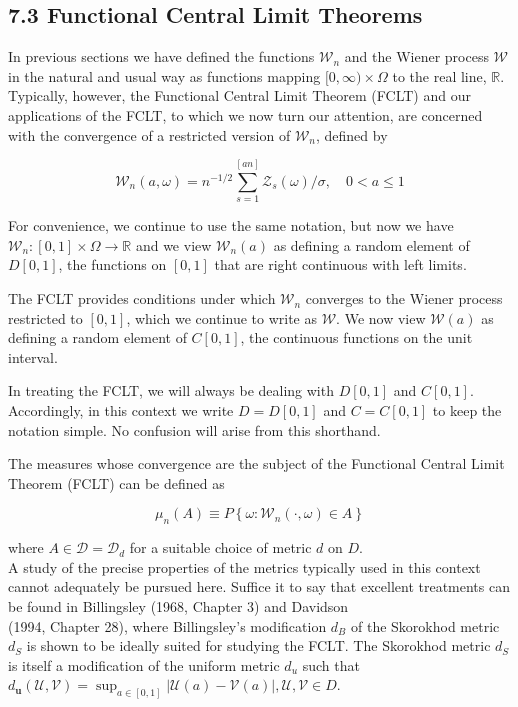 \documentclass[10pt]{article}
\begin{document}
\subsection*{7.3 Functional Central Limit Theorems}
In previous sections we have defined the functions $\mathcal{W}_{n}$ and the Wiener process $\mathcal{W}$ in the natural and usual way as functions mapping $[0, \infty) \times \Omega$ to the real line, $\mathbb{R}$. Typically, however, the Functional Central Limit Theorem (FCLT) and our applications of the FCLT, to which we now turn our attention, are concerned with the convergence of a restricted version of $\mathcal{W}_{n}$, defined by

$$
\mathcal{W}_{n}(a, \omega)=n^{-1 / 2} \sum_{s=1}^{[a n]} \mathcal{Z}_{s}(\omega) / \sigma, \quad 0<a \leq 1
$$

For convenience, we continue to use the same notation, but now we have $\mathcal{W}_{n}:[0,1] \times \Omega \rightarrow \mathbb{R}$ and we view $\mathcal{W}_{n}(a)$ as defining a random element of $D[0,1]$, the functions on $[0,1]$ that are right continuous with left limits.

The FCLT provides conditions under which $\mathcal{W}_{n}$ converges to the Wiener process restricted to $[0,1]$, which we continue to write as $\mathcal{W}$. We now view $\mathcal{W}(a)$ as defining a random element of $C[0,1]$, the continuous functions on the unit interval.

In treating the FCLT, we will always be dealing with $D[0,1]$ and $C[0,1]$. Accordingly, in this context we write $D=D[0,1]$ and $C=C[0,1]$ to keep the notation simple. No confusion will arise from this shorthand.

The measures whose convergence are the subject of the Functional Central Limit Theorem (FCLT) can be defined as

$$
\mu_{n}(A) \equiv P\left\{\omega: \mathcal{W}_{n}(\cdot, \omega) \in A\right\}
$$

where $A \in \mathcal{D}=\mathcal{D}_{d}$ for a suitable choice of metric $d$ on $D$.\\
A study of the precise properties of the metrics typically used in this context cannot adequately be pursued here. Suffice it to say that excellent treatments can be found in Billingsley (1968, Chapter 3) and Davidson\\
(1994, Chapter 28), where Billingsley's modification $d_{B}$ of the Skorokhod metric $d_{S}$ is shown to be ideally suited for studying the FCLT. The Skorokhod metric $d_{S}$ is itself a modification of the uniform metric $d_{u}$ such that $d_{\boldsymbol{u}}(\mathcal{U}, \mathcal{V})=\sup _{a \in[0,1]}|\mathcal{U}(a)-\mathcal{V}(a)|, \mathcal{U}, \mathcal{V} \in D$.
\end{document}
